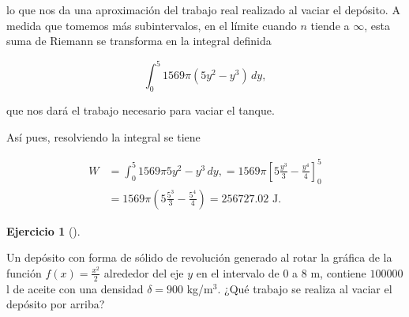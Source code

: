 \documentclass[
  spanish,
  a4paper,
]{scrreport}
\theoremstyle{definition}
\newtheorem{exercise}{Ejercicio}[chapter]
\theoremstyle{remark}
\begin{document}
\begin{tcolorbox}
lo que nos da una aproximación del trabajo real realizado al vaciar el
depósito. A medida que tomemos más subintervalos, en el límite cuando
\(n\) tiende a \(\infty\), esta suma de Riemann se transforma en la
integral definida

\[
\int_0^5 1569 \pi (5y^2-y^3)\,dy,
\]

que nos dará el trabajo necesario para vaciar el tanque.

Así pues, resolviendo la integral se tiene

\begin{align*}
W 
&= \int_0^5 1569 \pi 5y^2-y^3\,dy,
= 1569\pi \left[5\frac{y^3}{3}-\frac{y^4}{4}\right]_0^5 \\
&= 1569\pi\left(5\frac{5^3}{3}-\frac{5^4}{4}\right)
= 256727.02 \mbox{ J.}
\end{align*}

\end{tcolorbox}

\begin{exercise}[]\protect\hypertarget{exr-trabajo-deposito-2}{}\label{exr-trabajo-deposito-2}

Un depósito con forma de sólido de revolución generado al rotar la
gráfica de la función \(f(x)=\frac{x^2}{2}\) alrededor del eje \(y\) en
el intervalo de \(0\) a \(8\) m, contiene \(100000\) l de aceite con una
densidad \(\delta = 900\) kg/m\(^3\). ¿Qué trabajo se realiza al vaciar
el depósito por arriba?

\end{exercise}
\end{document}
